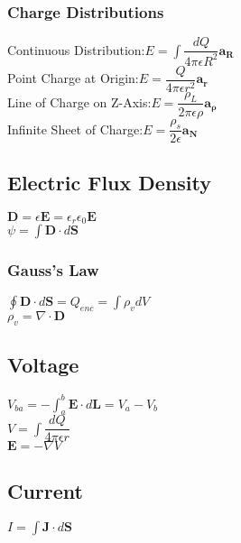 \documentclass[12pt]{exam}
\begin{document}
\begin{multicols}{2}
\begin{flushleft}
	\subsubsection*{Charge Distributions}
	{ \addtolength{\leftskip}{0.5in}
		Continuous Distribution:\quad $E=\int\dfrac{dQ}{4\pi\epsilon R^2}\mathbf{a_R}$\\[4pt]
		Point Charge at Origin:\quad $E=\dfrac{Q}{4\pi\epsilon r^2}\mathbf{a_r} $\\[4pt]
		Line of Charge on Z-Axis:\quad $E=\dfrac{\rho_L}{2\pi\epsilon\rho}\mathbf{a_\rho}$\\[4pt]
		Infinite Sheet of Charge:\quad $E=\dfrac{\rho_s}{2\epsilon}\mathbf{a_N}$\\
	}
	
	\subsection*{Electric Flux Density}
	{ \addtolength{\leftskip}{0.5in}
		$\mathbf{D} = \epsilon\mathbf{E} = \epsilon_r\epsilon_0\mathbf{E}$ \\[4pt]
		$\psi = \int\mathbf{D}\cdot d\mathbf{S} $ \\
	}
	
	\subsubsection*{Gauss's Law}
	{ \addtolength{\leftskip}{0.5in}
		$\oint\mathbf{D}\cdot d\mathbf{S} = Q_{enc} = \int\rho_v dV$ \\[4pt]
		$\rho_v = \nabla\cdot\mathbf{D}$ \\
	}
	
	\vfill\null	
	\columnbreak
	
	\subsection*{Voltage}
	{ \addtolength{\leftskip}{0.5in}
		$V_{ba} = -\int_a^b\mathbf{E}\cdot d\mathbf{L} = V_a - V_b $ \\[4pt]
		$V = \int\dfrac{dQ}{4\pi\epsilon r} $ \\[4pt]
		$\mathbf{E} = -\nabla V $ \\
	}
	
	\subsection*{Current}
	{ \addtolength{\leftskip}{0.5in}
		$ I = \int\mathbf{J}\cdot d\mathbf{S} $ \\
	}
	

\end{flushleft}
\end{multicols}
\end{document}
